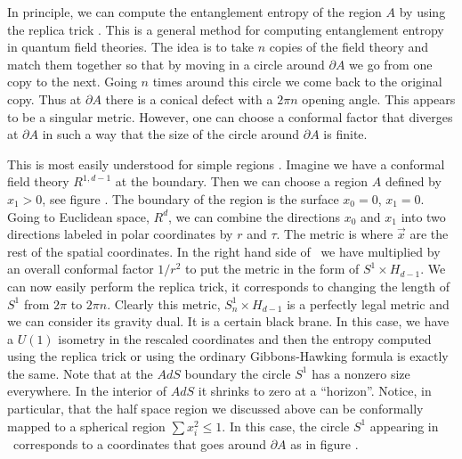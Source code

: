 In principle, we can compute the entanglement entropy of the region $A$ by using the replica trick  .
This is a general method for computing entanglement entropy in quantum field theories.
The idea is to take $n$ copies of the field theory and match them together so that by moving in a circle around
$\partial A $ we go from one copy to the next. Going $n$ times around this circle we come back to the original copy.
Thus at $\partial A$ there is a conical defect with a $2\pi n$ opening angle.
This appears to be a singular metric. However, one can choose a conformal factor that diverges at $\partial A$ in
such a way that the size of the circle around $\partial A$ is finite.


\ifig{}  {}
\ifig{} {}

This is most easily understood for simple regions .
 Imagine we have a  conformal field theory
 $R^{1,d-1}$ at the boundary. Then we can
choose a region $A$ defined by  $x_1>0$, see figure \rtb .
 The boundary of the region is the surface $x_0=0$, $x_1=0$. Going to Euclidean space, $R^{d}$,
we can combine the directions $x_0$ and $x_1$ into two directions labeled in polar coordinates by $r$ and $\tau$.
The metric is
\eqn{}
where $\vec x$ are the rest of the spatial coordinates. In the right hand side of \metrc\ we have multiplied
by an overall conformal factor $1/r^2$ to put the metric in the form of $S^1 \times H_{d-1}$. We can now easily
perform the replica trick, it corresponds to changing the length  of $S^1$ from $2\pi$  to $ 2 \pi n$.
Clearly this metric, $S^1_n \times H_{d-1}$ is a perfectly legal metric and we can consider its gravity dual. It is
a certain black brane. In this case, we have a $U(1)$ isometry in the rescaled coordinates and then the entropy
computed using the replica trick or using the ordinary Gibbons-Hawking formula is exactly the same. Note that at the
$AdS$ boundary the circle $S^1$ has a nonzero size everywhere.
In the interior of $AdS$ it shrinks to zero at a ``horizon''.
Notice, in particular, that the half space region we discussed above can be conformally mapped to
a spherical region $ \sum x_i^2 \leq 1 $. In this case, the circle $S^1$ appearing in \metrc\ corresponds
to a coordinates that goes around $\partial A $ as in figure \rtc .

